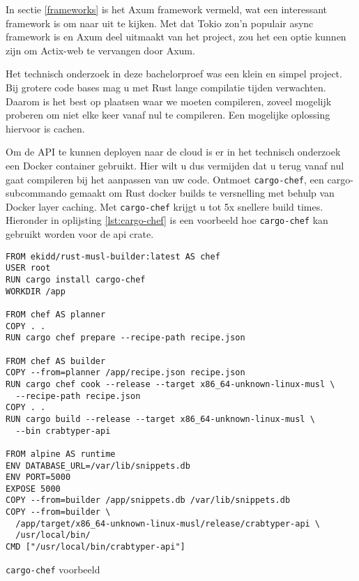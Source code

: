 \clearpage

In sectie \ref{frameworks} is het Axum framework vermeld, wat een interessant framework is om naar
uit te kijken. Met dat Tokio zon'n populair async framework is en Axum deel uitmaakt van het
project, zou het een optie kunnen zijn om Actix-web te vervangen door Axum. 

Het technisch onderzoek in deze bachelorproef was een klein en simpel project. Bij grotere code
bases mag u met Rust lange compilatie tijden verwachten. Daarom is het best op plaatsen waar we
moeten compileren, zoveel mogelijk proberen om niet elke keer vanaf nul te compileren. Een mogelijke
oplossing hiervoor is cachen.

Om de API te kunnen deployen naar de cloud is er in het technisch onderzoek een Docker container
gebruikt. Hier wilt u dus vermijden dat u terug vanaf nul gaat compileren bij het aanpassen van uw
code. Ontmoet \texttt{cargo-chef}, een cargo-subcommando gemaakt om Rust docker builds te
versnelling met behulp van Docker layer caching. Met \texttt{cargo-chef} krijgt u tot 5x
snellere build times. Hieronder in oplijsting \ref{lst:cargo-chef} is een voorbeeld hoe
\texttt{cargo-chef} kan gebruikt worden voor de api crate.

\begin{listing}[h]
\begin{verbatim}
FROM ekidd/rust-musl-builder:latest AS chef
USER root
RUN cargo install cargo-chef
WORKDIR /app

FROM chef AS planner
COPY . .
RUN cargo chef prepare --recipe-path recipe.json

FROM chef AS builder
COPY --from=planner /app/recipe.json recipe.json
RUN cargo chef cook --release --target x86_64-unknown-linux-musl \
  --recipe-path recipe.json
COPY . .
RUN cargo build --release --target x86_64-unknown-linux-musl \
  --bin crabtyper-api

FROM alpine AS runtime
ENV DATABASE_URL=/var/lib/snippets.db
ENV PORT=5000
EXPOSE 5000
COPY --from=builder /app/snippets.db /var/lib/snippets.db
COPY --from=builder \
  /app/target/x86_64-unknown-linux-musl/release/crabtyper-api \
  /usr/local/bin/
CMD ["/usr/local/bin/crabtyper-api"]
\end{verbatim}
\caption{\texttt{cargo-chef} voorbeeld}
\label{lst:cargo-chef}
\end{listing}
